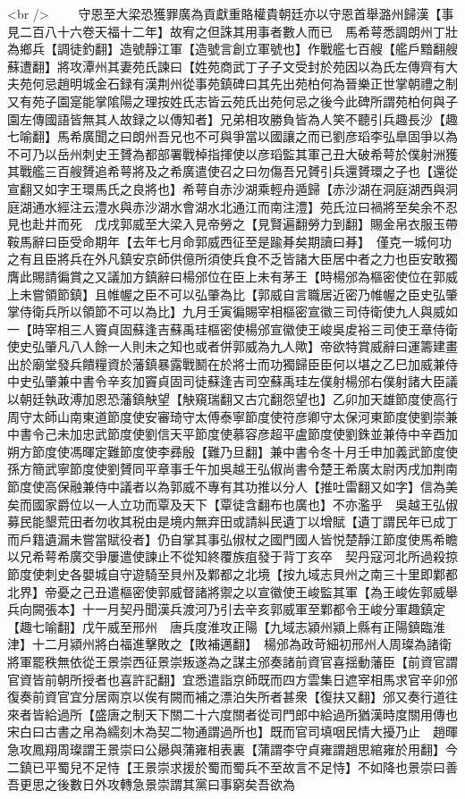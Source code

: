 <br />
　　守恩至大梁恐獲罪廣為貢獻重賂權貴朝廷亦以守恩首舉潞州歸漢【事見二百八十六卷天福十二年】故宥之但誅其用事者數人而已　馬希萼悉調朗州丁壯為鄉兵【調徒釣翻】造號靜江軍【造號言創立軍號也】作戰艦七百艘【艦戶黯翻艘蘇遭翻】將攻潭州其妻苑氏諫曰【姓苑商武丁子子文受封於苑因以為氏左傳齊有大夫苑何忌趙明城金石録有漢荆州從事苑鎮碑曰其先出苑柏何為晉樂正世掌朝禮之制又有苑子園寔能掌隂陽之理按姓氏志皆云苑氏出苑何忌之後今此碑所謂苑柏何與子園左傳國語皆無其人故録之以傳知者】兄弟相攻勝負皆為人笑不聽引兵趣長沙【趣七喻翻】馬希廣聞之曰朗州吾兄也不可與爭當以國讓之而已劉彦瑫李弘臯固爭以為不可乃以岳州刺史王贇為都部署戰棹指揮使以彦瑫監其軍己丑大破希萼於僕射洲獲其戰艦三百艘贇追希萼將及之希廣遣使召之曰勿傷吾兄贇引兵還贇環之子也【還從宣翻又如字王環馬氏之良將也】希萼自赤沙湖乘輕舟遁歸【赤沙湖在洞庭湖西與洞庭湖通水經注云澧水與赤沙湖水會湖水北通江而南注澧】苑氏泣曰禍將至矣余不忍見也赴井而死　戊戌郭威至大梁入見帝勞之【見賢遍翻勞力到翻】賜金帛衣服玉帶鞍馬辭曰臣受命期年【去年七月命郭威西征至是踰朞矣期讀曰朞】　僅克一城何功之有且臣將兵在外凡鎮安京師供億所須使兵食不乏皆諸大臣居中者之力也臣安敢獨膺此賜請徧賞之又議加方鎮辭曰楊邠位在臣上未有茅王【時楊邠為樞密使位在郭威上未嘗領節鎮】且帷幄之臣不可以弘肇為比【郭威自言職居近密乃帷幄之臣史弘肇掌侍衛兵所以領節不可以為比】九月壬寅徧賜宰相樞密宣徽三司侍衛使九人與威如一【時宰相三人竇貞固蘇逢吉蘇禹珪樞密使楊邠宣徽使王峻吳䖍裕三司使王章侍衛使史弘肇凡八人餘一人則未之知也或者併郭威為九人歟】帝欲特賞威辭曰運籌建畫出於廟堂發兵饋糧資於藩鎮暴露戰鬭在於將士而功獨歸臣臣何以堪之乙巳加威兼侍中史弘肇兼中書令辛亥加竇貞固司徒蘇逢吉司空蘇禹珪左僕射楊邠右僕射諸大臣議以朝廷執政溥加恩恐藩鎮觖望【觖窺瑞翻又古宂翻怨望也】乙卯加天雄節度使高行周守太師山南東道節度使安審琦守太傅泰寧節度使符彦卿守太保河東節度使劉崇兼中書令己未加忠武節度使劉信天平節度使慕容彦超平盧節度使劉銖並兼侍中辛酉加朔方節度使馮暉定難節度使李彞殷【難乃旦翻】兼中書令冬十月壬申加義武節度使孫方簡武寧節度使劉贇同平章事壬午加吳越王弘俶尚書令楚王希廣太尉丙戌加荆南節度使高保融兼侍中議者以為郭威不專有其功推以分人【推吐雷翻又如字】信為美矣而國家爵位以一人立功而覃及天下【覃徒含翻布也廣也】不亦濫乎　吳越王弘俶募民能墾荒田者勿收其税由是境内無弃田或請糾民遺丁以增賦【遺丁謂民年已成丁而戶籍遺漏未嘗當賦役者】仍自掌其事弘俶杖之國門國人皆悦楚靜江節度使馬希瞻以兄希萼希廣交爭屢遣使諫止不從知終覆族疽發于背丁亥卒　契丹寇河北所過殺掠節度使刺史各嬰城自守遊騎至貝州及鄴都之北境【按九域志貝州之南三十里即鄴都北界】帝憂之己丑遣樞密使郭威督諸將禦之以宣徽使王峻監其軍【為王峻佐郭威舉兵向闕張本】十一月契丹聞漢兵渡河乃引去辛亥郭威軍至鄴都令王峻分軍趣鎮定【趣七喻翻】戊午威至邢州　唐兵度淮攻正陽【九域志潁州潁上縣有正陽鎮臨淮津】十二月潁州將白福進擊敗之【敗補邁翻】　楊邠為政苛細初邢州人周璨為諸衛將軍罷秩無依從王景崇西征景崇叛遂為之謀主邠奏諸前資官喜揺動藩臣【前資官謂官資皆前朝所授者也喜許記翻】宜悉遣詣京師既而四方雲集日遮宰相馬求官辛卯邠復奏前資官宜分居兩京以俟有闕而補之漂泊失所者甚衆【復扶又翻】邠又奏行道往來者皆給過所【盛唐之制天下關二十六度關者從司門郎中給過所猶漢時度關用傳也宋白曰古書之帛為繻刻木為契二物通謂過所也】既而官司填咽民情大擾乃止　趙暉急攻鳳翔周璨謂王景崇曰公曏與蒲雍相表裏【蒲謂李守貞雍謂趙思綰雍於用翻】今二鎮已平蜀兒不足恃【王景崇求援於蜀而蜀兵不至故言不足恃】不如降也景崇曰善吾更思之後數日外攻轉急景崇謂其黨曰事窮矣吾欲為
